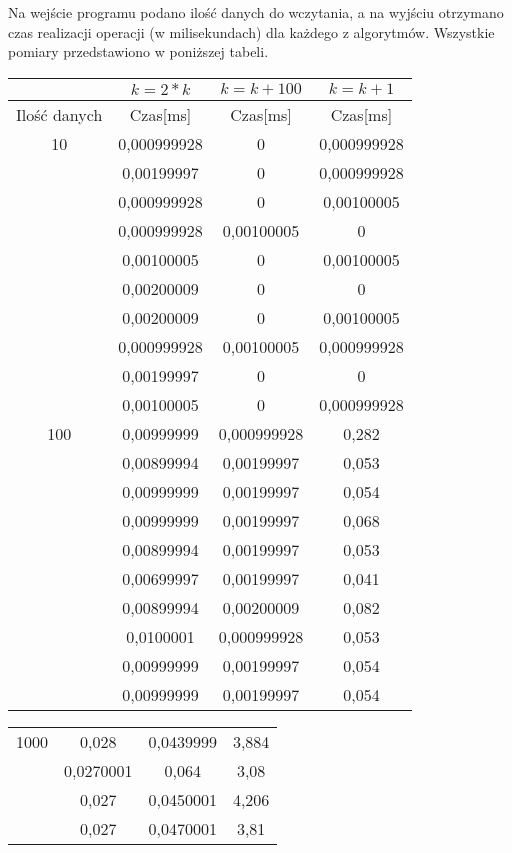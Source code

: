 \documentclass[10pt, a4paper]{article}
\begin{document}
\begin{flushleft}
Na wejście programu podano ilość danych do wczytania, a na wyjściu otrzymano czas realizacji operacji (w milisekundach) dla każdego z algorytmów. Wszystkie pomiary przedstawiono w poniższej tabeli.

\begin{table}[h]
\centering
\begin{tabular}{|c|c|c|c|} \hline
& $k=2*k$ & $k=k+100$ & $k=k+1$ \\ \hline
Ilość danych & Czas[ms] & Czas[ms] & Czas[ms] \\ \hline
10 & 0,000999928 & 0 & 0,000999928 \\
 & 0,00199997 & 0 & 0,000999928 \\
 & 0,000999928 & 0 & 0,00100005 \\
 & 0,000999928 & 0,00100005 & 0 \\
 & 0,00100005 & 0 & 0,00100005 \\
 & 0,00200009 & 0 & 0 \\
 & 0,00200009 & 0 & 0,00100005 \\
 & 0,000999928 & 0,00100005 &  0,000999928 \\
 & 0,00199997 & 0 & 0 \\
 & 0,00100005 & 0 & 0,000999928 \\ \hline
100 & 0,00999999 & 0,000999928 & 0,282 \\
 & 0,00899994 & 0,00199997 & 0,053 \\
 & 0,00999999 & 0,00199997 & 0,054 \\
 & 0,00999999 & 0,00199997 & 0,068 \\
 & 0,00899994 & 0,00199997 & 0,053 \\
 & 0,00699997 & 0,00199997 & 0,041 \\
 & 0,00899994 & 0,00200009 & 0,082 \\
 & 0,0100001 & 0,000999928 & 0,053 \\
 & 0,00999999 & 0,00199997 & 0,054 \\
 & 0,00999999 & 0,00199997 & 0,054 \\ \hline
\end{tabular}
\end{table}
\newpage
\begin{table}[h]
\centering
\begin{tabular}{|c|c|c|c|} \hline
1000 & 0,028 & 0,0439999 & 3,884 \\
 & 0,0270001 & 0,064 & 3,08 \\
 & 0,027 & 0,0450001 & 4,206 \\
 & 0,027 & 0,0470001 & 3,81 \\

\end{tabular}
\end{table}
\end{flushleft}
\end{document}
